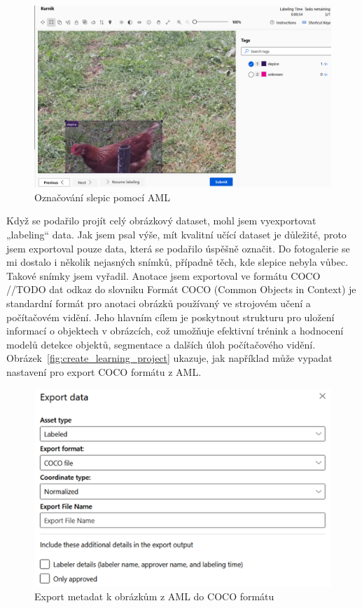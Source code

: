\begin{figure}[htbp]
    \centering
    \includegraphics[width=1.0\textwidth]{img/chicken_labeling}
    \caption{Označování slepic pomocí AML}
    \label{fig:chicken_labeling}
\end{figure}

Když se podařilo projít celý obrázkový dataset, mohl jsem vyexportovat „labeling“ data.
Jak jsem psal výše, mít kvalitní učící dataset je důležité, proto jsem exportoval pouze data, která se podařilo úspěšně označit.
Do fotogalerie se mi dostalo i několik nejasných snímků, případně těch, kde slepice nebyla vůbec.
Takové snímky jsem vyřadil.
Anotace jsem exportoval ve formátu COCO~\cite{COCOFormat}  //TODO dat odkaz do slovniku
Formát COCO (Common Objects in Context) je standardní formát pro anotaci obrázků používaný ve strojovém učení a počítačovém vidění.
Jeho hlavním cílem je poskytnout strukturu pro uložení informací o objektech v obrázcích, což umožňuje efektivní trénink a hodnocení modelů detekce objektů, segmentace a dalších úloh počítačového vidění.
Obrázek~\ref{fig:create_learning_project} ukazuje, jak například může vypadat nastavení pro export COCO formátu z AML.

\begin{figure}[htbp]
    \centering
    \includegraphics[width=1.0\textwidth]{img/export_coco_format}
    \caption{Export metadat k obrázkům z AML do COCO formátu}
    \label{fig:export_coco_format}
\end{figure}

